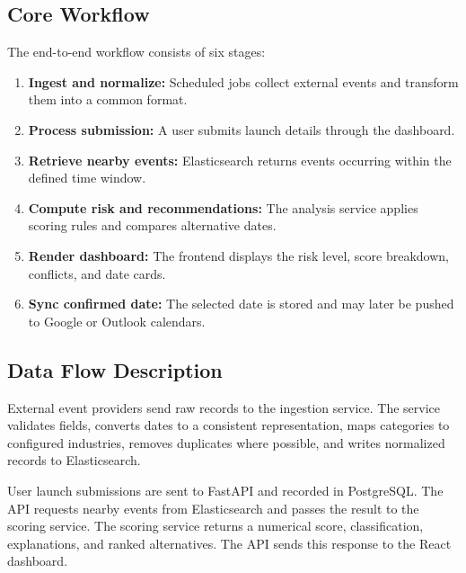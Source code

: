 \documentclass[12pt]{article}
\begin{document}
\subsection{Core Workflow}
The end-to-end workflow consists of six stages:
\begin{enumerate}[leftmargin=0.7cm]
\item \textbf{Ingest and normalize:} Scheduled jobs collect external events and transform them into a common format.
\item \textbf{Process submission:} A user submits launch details through the dashboard.
\item \textbf{Retrieve nearby events:} Elasticsearch returns events occurring within the defined time window.
\item \textbf{Compute risk and recommendations:} The analysis service applies scoring rules and compares alternative dates.
\item \textbf{Render dashboard:} The frontend displays the risk level, score breakdown, conflicts, and date cards.
\item \textbf{Sync confirmed date:} The selected date is stored and may later be pushed to Google or Outlook calendars.
\end{enumerate}

\subsection{Data Flow Description}
External event providers send raw records to the ingestion service. The service validates fields, converts dates to a consistent representation, maps categories to configured industries, removes duplicates where possible, and writes normalized records to Elasticsearch.

User launch submissions are sent to FastAPI and recorded in PostgreSQL. The API requests nearby events from Elasticsearch and passes the result to the scoring service. The scoring service returns a numerical score, classification, explanations, and ranked alternatives. The API sends this response to the React dashboard.
\end{document}
